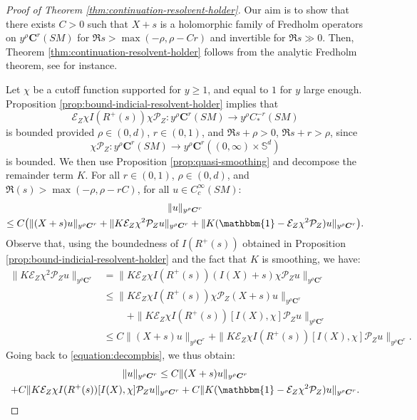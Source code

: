 \documentclass[10pt]{amsart}
\newcommand{\bC}{\boldsymbol{C}}
\newcommand{\Ss}{\mathbb{S}}
\theoremstyle{plain}
\theoremstyle{definition}
\begin{document}
\begin{proof}[Proof of Theorem \ref{thm:continuation-resolvent-holder}]
Our aim is to show that there exists $C > 0$ such that $X+s$ is a holomorphic family of Fredholm operators on $y^\rho \bC^r(SM)$ for $\Re s > \max(-\rho,\rho-Cr)$ and invertible for $\Re s \gg 0$. Then, Theorem \ref{thm:continuation-resolvent-holder} follows from the analytic Fredholm theorem, see \cite[App.\,D]{Zworski-book} for instance.

Let $\chi$ be a cutoff function supported for $y\geq 1$, and equal to $1$ for $y$ large enough. Proposition \ref{prop:bound-indicial-resolvent-holder} implies that
\[
\mathcal{E}_Z\chi I(R^+(s)) \chi\mathcal{P}_Z : y^\rho \bC^r(SM) \to y^\rho C^{-r}_*(SM)
\]
is bounded provided $\rho \in (0,d)$, $r\in (0,1)$, and $\Re s + \rho >0$, $\Re s + r > \rho$, since
\[
\chi \mathcal{P}_Z : y^\rho \bC^r(SM) \to y^\rho \bC^r((0,\infty) \times \Ss^d)
\]
is bounded. We then use Proposition \ref{prop:quasi-smoothing} and decompose the remainder term $K$. For all $r \in (0,1)$, $\rho \in (0,d)$, and $\Re(s) > \max(-\rho,\rho-rC)$, for all $u \in C^\infty_{c}(SM)$:
\begin{multline}
\label{equation:decompbis}
\|u\|_{y^\rho \bC^r}\\
\leq C \bigl(\| (X+s)u\|_{y^\rho\bC^r} + \| K \mathcal{E}_Z\chi^2 \mathcal{P}_Z u\|_{y^\rho\bC^r} + \|K(\mathbbm{1}-\mathcal{E}_Z\chi^2\mathcal{P}_Z)u\|_{y^\rho\bC^r}\bigr).
\end{multline}
Observe that, using the boundedness of $I(R^+(s))$ obtained in Proposition \ref{prop:bound-indicial-resolvent-holder} and the fact that $K$ is smoothing, we have:
\[
\begin{split}
\| K \mathcal{E}_Z\chi^2 \mathcal{P}_Z u\|_{y^\rho\bC^r} & = \| K \mathcal{E}_Z\chi I(R^+(s)) (I(X)+s) \chi \mathcal{P}_Z u\|_{y^\rho\bC^r} \\
& \leq \| K \mathcal{E}_Z\chi I(R^+(s)) \chi \mathcal{P}_Z (X+s)u\|_{y^\rho\bC^r} \\
& \hspace{1cm}+ \| K \mathcal{E}_Z\chi I(R^+(s)) [I(X), \chi] \mathcal{P}_Z u\|_{y^\rho\bC^r} \\
& \leq C \|(X+s)u\|_{y^\rho\bC^r}+\| K \mathcal{E}_Z\chi I(R^+(s)) [I(X), \chi] \mathcal{P}_Z u\|_{y^\rho\bC^r}.
\end{split}
\]
Going back to \eqref{equation:decompbis}, we thus obtain:
\begin{multline}\label{equation:comp}
\|u\|_{y^\rho \bC^r}\leq C \| (X+s)u\|_{y^\rho\bC^r} \\
+ C\| K \mathcal{E}_Z\chi I(R^+(s)) [I(X), \chi] \mathcal{P}_Z u\|_{y^\rho\bC^r} + C\|K(\mathbbm{1}-\mathcal{E}_Z\chi^2\mathcal{P}_Z)u\|_{y^\rho\bC^r}.
\end{multline}


\end{proof}
\end{document}
